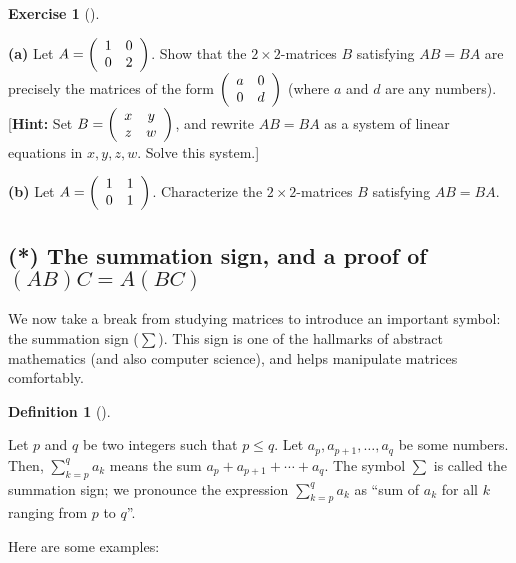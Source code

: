 \documentclass[numbers=enddot,12pt,final,onecolumn,notitlepage]{scrartcl}%
\theoremstyle{definition}
\newtheorem{defi}[theo]{Definition}
\newenvironment{definition}[1][]
{\begin{defi}[#1]\begin{leftbar}}
{\end{leftbar}\end{defi}}
\newtheorem{exmp}[theo]{Exercise}
\newenvironment{exercise}[1][]
{\begin{exmp}[#1]\begin{leftbar}}
{\end{leftbar}\end{exmp}}
\let\sumnonlimits\sum
\renewcommand{\sum}{\sumnonlimits\limits}
\begin{document}
\begin{exercise}
\label{exe.commutativity-example}\textbf{(a)} Let $A=\left(
\begin{array}
[c]{cc}%
1 & 0\\
0 & 2
\end{array}
\right)  $. Show that the $2\times2$-matrices $B$ satisfying $AB=BA$ are
precisely the matrices of the form $\left(
\begin{array}
[c]{cc}%
a & 0\\
0 & d
\end{array}
\right)  $ (where $a$ and $d$ are any numbers). [\textbf{Hint:} Set $B=\left(
%
\begin{array}
[c]{cc}%
x & y\\
z & w
\end{array}
\right)  $, and rewrite $AB=BA$ as a system of linear equations in $x,y,z,w$.
Solve this system.]

\textbf{(b)} Let $A=\left(
\begin{array}
[c]{cc}%
1 & 1\\
0 & 1
\end{array}
\right)  $. Characterize the $2\times2$-matrices $B$ satisfying $AB=BA$.
\end{exercise}

\subsection{\label{sect.intro.sum}(*) The summation sign, and a proof of
$\left(  AB\right)  C=A\left(  BC\right)  $}

We now take a break from studying matrices to introduce an important symbol:
the summation sign ($\sum$). This sign is one of the hallmarks of abstract
mathematics (and also computer science), and helps manipulate matrices comfortably.

\begin{definition}
\label{def.sum}Let $p$ and $q$ be two integers such that $p\leq q$. Let
$a_{p},a_{p+1},\ldots,a_{q}$ be some numbers. Then, $\sum_{k=p}^{q}a_{k}$
means the sum $a_{p}+a_{p+1}+\cdots+a_{q}$. The symbol $\sum$ is called the
summation sign; we pronounce the expression $\sum_{k=p}^{q}a_{k}$ as
\textquotedblleft sum of $a_{k}$ for all $k$ ranging from $p$ to
$q$\textquotedblright.
\end{definition}

Here are some examples:
\end{document}

